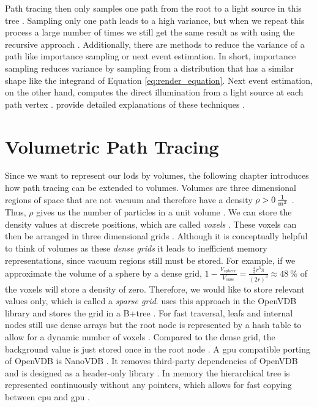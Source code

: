 Path tracing then only samples one path from the root to a light source in this tree \cite{rendering_equation}.
Sampling only one path leads to a high variance, but when we repeat this process a large number of times we still get the same result as with using the recursive approach \cite{pbr}.
Additionally, there are methods to reduce the variance of a path like importance sampling or next event estimation.
In short, importance sampling reduces variance by sampling from a distribution that has a similar shape like the integrand of Equation \ref{eq:render_equation}.
Next event estimation, on the other hand, computes the direct illumination from a light source at each path vertex \cite{pbr}.
\citeauthor{pbr} provide detailed explanations of these techniques \cite{pbr}.

\section{Volumetric Path Tracing}
Since we want to represent our \acsp{lod} by volumes, the following chapter introduces how path tracing can be extended to volumes.
Volumes are three dimensional regions of space that are not vacuum and therefore have a density ${\rho > \SI{0}{\frac{1}{\m^3}}}$ \cite{pbr}.
Thus, $\rho$ gives us the number of particles in a unit volume \cite{novak_overview}.
We can store the density values at discrete positions, which are called \textit{voxels} \cite{pbr}.
These voxels can then be arranged in three dimensional grids \cite{pbr}.
Although it is conceptually helpful to think of volumes as these \textit{dense grids} it leads to inefficient memory representations, since vacuum regions still must be stored.
For example, if we approximate the volume of a sphere by a dense grid, $1 - \frac{V_{sphere}}{V_{cube}} = \frac{\frac{4}{3}r^3\pi}{(2r)^3}\approx \SI{48}{\%}$ of the voxels will store a density of zero.
Therefore, we would like to store relevant values only, which is called a \textit{sparse grid}.
\citeauthor{museth_vdb} uses this approach in the OpenVDB library and stores the grid in a B+tree \cite{museth_vdb}.
For fast traversal, leafs and internal nodes still use dense arrays but the root node is represented by a hash table to allow for a dynamic number of voxels \cite{museth_vdb}.
Compared to the dense grid, the background value is just stored once in the root node \cite{museth_vdb}.
A \ac{gpu} compatible porting of OpenVDB is NanoVDB \cite{museth_nanovdb}.
It removes third-party dependencies of OpenVDB and is designed as a header-only library \cite{museth_nanovdb}.
In memory the hierarchical tree is represented continuously without any pointers, which allows for fast copying between \ac{cpu} and \ac{gpu} \cite{museth_nanovdb}.

